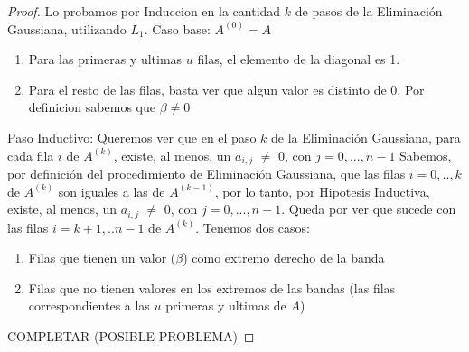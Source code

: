   \begin{proof}

    Lo probamos por Induccion en la cantidad $k$ de pasos de la Eliminación Gaussiana, utilizando $L_{1}$.
    \newline
    Caso base: $A^{(0)} = A$
    \begin{enumerate}
      \item Para las primeras y ultimas $u$ filas, el elemento de la diagonal es 1.
      \item Para el resto de las filas, basta ver que algun valor es distinto de 0. Por definicion sabemos que $\beta \neq 0$
    \end{enumerate}
    Paso Inductivo: Queremos ver que en el paso $k$ de la Eliminación Gaussiana, para cada fila $i$ de $A^{(k)}$, existe, al menos, un $a_{i,j}$ $\neq$ 0, con $j = 0,..., n-1$
    \newline
    Sabemos, por definición del procedimiento de Eliminación Gaussiana, que las filas $i = 0,..,k$ de $A^{(k)}$ son iguales a las de $A^{(k-1)}$, por lo tanto, por Hipotesis Inductiva,
    existe, al menos, un $a_{i,j}$ $\neq$ 0, con $j = 0,..., n-1$.
    \newline
    Queda por ver que sucede con las filas $i = k+1,..n-1$ de $A^{(k)}$. Tenemos dos casos:
    \begin{enumerate}
      \item Filas que tienen un valor ($\beta$) como extremo derecho de la banda
      \item Filas que no tienen valores en los extremos de las bandas (las filas correspondientes a las $u$ primeras y ultimas de $A$)
    \end{enumerate}
    COMPLETAR (POSIBLE PROBLEMA)

  \end{proof}
